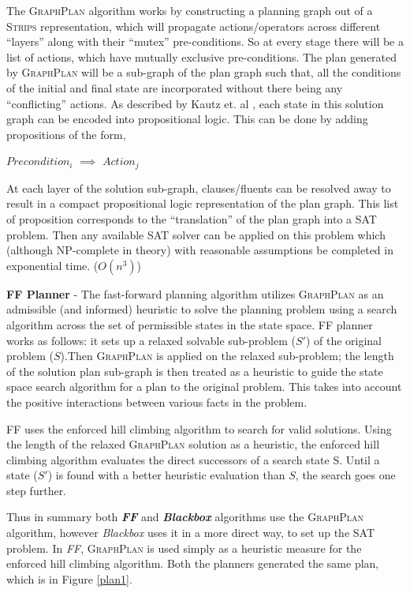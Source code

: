 \documentclass[10pt, letter]{article}
\begin{document}
The \textsc{GraphPlan} algorithm works by constructing a planning graph out of a \textsc{Strips} representation, which will propagate actions/operators across different ``layers'' along with their ``mutex'' pre-conditions. So at every stage there will be a list of actions, which have mutually exclusive pre-conditions. The plan generated by \textsc{GraphPlan} will be a sub-graph of the plan graph such that, all the conditions of the initial and final state are incorporated without there being any ``conflicting'' actions. As described by Kautz et. al \cite{kautz1996encoding}, each state in this solution graph can be encoded into propositional logic. This can be done by adding propositions of the form,
\begin{center}
$Precondition_i$ $\implies$ $Action_j$
\end{center}
At each layer of the solution sub-graph, clauses/fluents can be resolved away to result in a compact propositional logic representation of the plan graph. This list of proposition corresponds to the ``translation'' of the plan graph into a SAT problem. Then any available SAT solver can be applied on this problem which (although NP-complete in theory) with reasonable assumptions be completed in exponential time. ($O(n^3)$)

\textbf{FF Planner} - The fast-forward planning algorithm utilizes \textsc{GraphPlan} as an admissible (and informed) heuristic to solve the planning problem using a search algorithm across the set of permissible states in the state space. FF planner works as follows: it sets up a relaxed solvable sub-problem ($S\prime$) of the original problem ($S$).Then \textsc{GraphPlan} is applied on the relaxed sub-problem; the length of the solution plan sub-graph is then treated as a heuristic to guide the state space search algorithm for a plan to the original problem. This takes into account the positive interactions between various facts in the problem.

FF uses the enforced hill climbing algorithm to search for valid solutions. Using the length of the relaxed \textsc{GraphPlan} solution as a heuristic, the enforced hill climbing algorithm evaluates the direct successors of a search state S. Until a state ($S\prime$) is found with a better heuristic evaluation than $S$, the search goes one step further.

Thus in summary both \textit{\textbf{FF}} and \textit{\textbf{Blackbox}} algorithms use the \textsc{GraphPlan} algorithm, however \textit{Blackbox} uses it in a more direct way, to set up the SAT problem. In \textit{FF}, \textsc{GraphPlan} is used simply as a heuristic measure for the enforced hill climbing algorithm.
Both the planners generated the same plan, which is in Figure \ref{plan1}.
\end{document}
